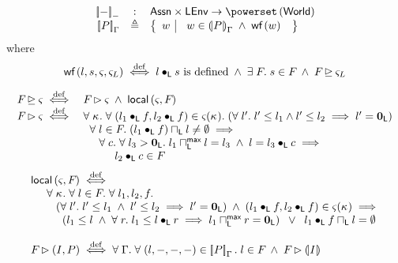 %
%
\begin{definition}
%
\[
\begin{array}{r c l}
\sem[-]{-} & : & \Assertions \times \LEnv \rightarrow \pset{\Worlds} \\

\sem{P} & \eqdef & 
\left\{
\begin{array}{l | l}
 w &
 \begin{array}{l}
 	 w \in \intermediateSem{P} \;\land\;
 	 \wf{w}
 	\end{array} 
\end{array}
\right\}\\
\end{array}
\]
%
where 
%
\[
	\wf{l, s, \amod{}, \amod{L}} \iffdef l \composeL s  \text{ is defined} \;\land\; \exsts{\fence{}} s \in \fence{} \;\land\; \fence{} \strictfences \amod{L}
\]
%
\end{definition}
%
%
\[ 
\begin{array}{r l}
	\fence{} \strictfences \amod{} \iffdef
 		& \fence{} \fences \amod{} \;\land\; \local{\amod{}}{\fence{}}\\
 		
  \fence{} \fences \amod{} \iffdef 
 & \for{\ca{}} \for {(l_1 \composeL f, l_2 \composeL f) \in \amod{}(\ca{})} (\for{l'} l' \leq l_1 \land l' \leq l_2 \implies l' = \unitL ) \\
 & \hspace*{0.2cm} \for{l \in \fence{}} (l_1 \composeL f) \meetL l \not= \emptyset \implies \\
 & \hspace*{0.5cm} \for{c} \for{l_3 > \unitL} l_1 \maxMeetL l = l_3 \;\land\; l = l_3 \composeL c\implies\\
 & \hspace*{1cm} l_2 \composeL c \in \fence{}	 
\end{array}
\]
%
%
\[
\begin{array}{l}
	\local{\amod{}}{\fence{}} \iffdef\\
	\hspace*{0.5cm}
	\for{\ca{}} \for{l \in \fence{}} \for{l_1, l_2, f}\\
	\hspace*{0.8cm} (\for{l'} l' \leq l_1 \;\land\; l' \leq l_2 \implies l' = \unitL) \;\land\; (l_1 \composeL f, l_2 \composeL f) \in \amod{}(\ca{})  \implies \\
	 \hspace*{1cm} \left(l_1 \leq l \;\land\; \for{r} l_1 \leq l \composeL r \implies l_1 \maxMeetL r = \unitL\right) \;\;\lor\;\; l_1 \composeL f \meetL l = \emptyset\\\\
	 
 \fence{} \fences (I, P) \iffdef  
 \for{\lenv} \for{(l, -, -, -) \in \sem[\lenv]{P}} l  \in \fence{} \;\land\; \fence{} \fences \intermediateSemI{I}
\end{array}
\]
